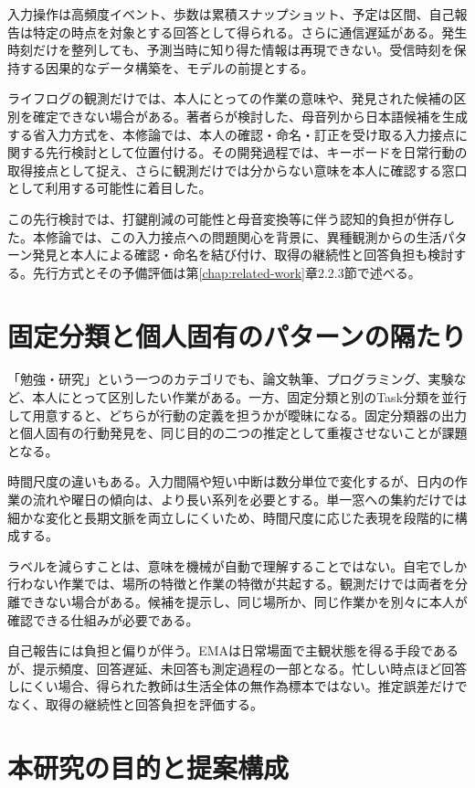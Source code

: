 入力操作は高頻度イベント、歩数は累積スナップショット、予定は区間、自己報告は特定の時点を対象とする回答として得られる。さらに通信遅延がある。発生時刻だけを整列しても、予測当時に知り得た情報は再現できない。受信時刻を保持する因果的なデータ構築を、モデルの前提とする。

ライフログの観測だけでは、本人にとっての作業の意味や、発見された候補の区別を確定できない場合がある。著者らが検討した、母音列から日本語候補を生成する省入力方式\autocite{tanaka2026fss}を、本修論では、本人の確認・命名・訂正を受け取る入力接点に関する先行検討として位置付ける。その開発過程では、キーボードを日常行動の取得接点として捉え、さらに観測だけでは分からない意味を本人に確認する窓口として利用する可能性に着目した。

この先行検討では、打鍵削減の可能性と母音変換等に伴う認知的負担が併存した。本修論では、この入力接点への問題関心を背景に、異種観測からの生活パターン発見と本人による確認・命名を結び付け、取得の継続性と回答負担も検討する。先行方式とその予備評価は第\ref{chap:related-work}章2.2.3節で述べる。

\section{固定分類と個人固有のパターンの隔たり}

「勉強・研究」という一つのカテゴリでも、論文執筆、プログラミング、実験など、本人にとって区別したい作業がある。一方、固定分類と別のTask分類を並行して用意すると、どちらが行動の定義を担うかが曖昧になる。固定分類器の出力と個人固有の行動発見を、同じ目的の二つの推定として重複させないことが課題となる。

時間尺度の違いもある。入力間隔や短い中断は数分単位で変化するが、日内の作業の流れや曜日の傾向は、より長い系列を必要とする。単一窓への集約だけでは細かな変化と長期文脈を両立しにくいため、時間尺度に応じた表現を段階的に構成する。

ラベルを減らすことは、意味を機械が自動で理解することではない。自宅でしか行わない作業では、場所の特徴と作業の特徴が共起する。観測だけでは両者を分離できない場合がある。候補を提示し、同じ場所か、同じ作業かを別々に本人が確認できる仕組みが必要である。

自己報告には負担と偏りが伴う。EMAは日常場面で主観状態を得る手段であるが、提示頻度、回答遅延、未回答も測定過程の一部となる\autocite{shiffman2008ema}。忙しい時点ほど回答しにくい場合、得られた教師は生活全体の無作為標本ではない。推定誤差だけでなく、取得の継続性と回答負担を評価する。

\section{本研究の目的と提案構成}

